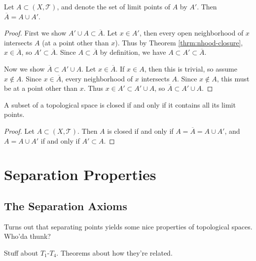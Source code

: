 \documentclass[10pt]{report}
\begin{document}
\begin{thrm}{}{}
	Let $A \subset (X,\mathcal{T})$, and denote the set of limit points of $A$ by $A'$. Then $\overline{A}=A \cup A'$.
\end{thrm}
\begin{proof}
	First we show $A' \cup A \subset \overline{A} $. Let $x \in A'$, then every open neighborhood of $x$ intersects $A$ (at a point other than $x$). Thus by Theorem \ref{thrm:nhood-closure}, $x \in \overline{A}$, so $A' \subset  \overline{A}$. Since $A \subset \overline{A}$ by definition, we have $A \subset A' \subset \overline{A}$.

	Now we show $\overline{A} \subset A' \cup A$. Let $x \in \overline{A}$. If $x \in A$, then this is trivial, so assume $x \not\in A$. Since $x \in \overline{A}$, every neighborhood of $x$ intersects $A$. Since $x \not\in A$, this must be at a point other than $x$. Thus $x \in A'\subset A' \cup A$, so $\overline{A} \subset A' \cup A$.
\end{proof}

\begin{cor}
	A subset of a topological space is closed if and only if it contains all its limit points.
\end{cor}
\begin{proof}
	Let $A \subset (X, \mathcal{T})$. Then $A$ is closed if and only if $A = \overline{A} = A \cup A'$, and $A = A \cup A'$ if and only if $A' \subset A$.
\end{proof}



\chapter{Separation Properties}



\section{The Separation Axioms}

Turns out that separating points yields some nice properties of topological spaces. Who'da thunk?

{\color{red}Stuff about $T_1$-$T_4$. Theorems about how they're related.}
\end{document}
